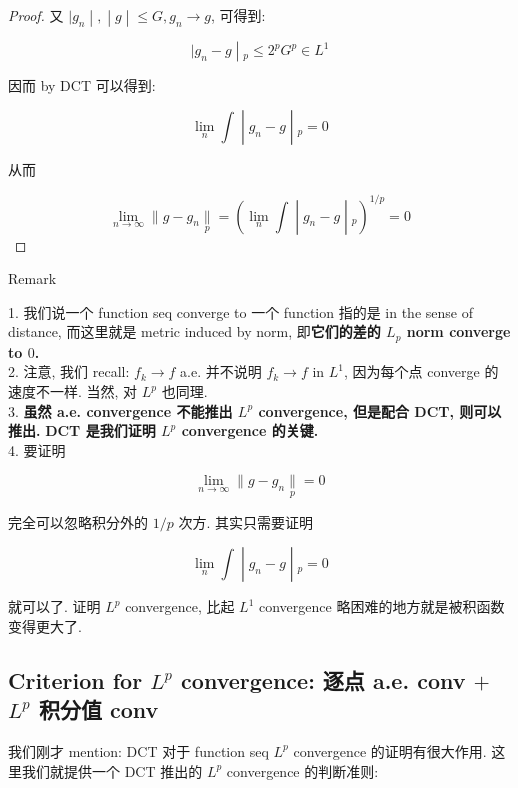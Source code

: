 \documentclass{qlnotes-export}
\begin{document}
\begin{proof}
又 \(\left. |g_{n} \middle| , \middle| g \middle| \leq G,g_{n}\rightarrow g \right.\), 可得到:

\[\left. |g_{n} - g \middle| {}_{p} \leq 2^{p}G^{p} \in L^{1} \right.\]

因而 by DCT 可以得到:

\[\left. \lim\limits_{n}\int \middle| g_{n} - g \middle| {}_{p} = 0 \right.\]

从而

\[\left. \lim\limits_{n\rightarrow\infty} \parallel g - g_{n}\underset{p}{\parallel} = (\lim\limits_{n}\int \middle| g_{n} - g \middle| {}_{p})^{1/p} = 0 \right.\]

\end{proof}

\begin{qlremark}{Remark}

1. 我们说一个 function seq converge to 一个 function 指的是 in the sense of distance, 而这里就是 metric induced by norm, 即\textbf{它们的差的 \(L_{p}\) norm converge to \(0\).}\\
2. 注意, 我们 recall: \(f_{k}\rightarrow f\) a.e. 并不说明 \(f_{k}\rightarrow f\) in \(L^{1}\), 因为每个点 converge 的速度不一样. 当然, 对 \(L^{p}\) 也同理.\\
3. \textbf{虽然 a.e. convergence 不能推出 \(L^{p}\) convergence, 但是配合 DCT, 则可以推出.} \textbf{DCT 是我们证明 \(L^{p}\) convergence 的关键.}\\
4. 要证明

\[\lim\limits_{n\rightarrow\infty} \parallel g - g_{n}\underset{p}{\parallel} = 0\]

完全可以忽略积分外的 \(1/p\) 次方. 其实只需要证明

\[\left. \lim\limits_{n}\int \middle| g_{n} - g \middle| {}_{p} = 0 \right.\]

就可以了. 证明 \(L^{p}\) convergence, 比起 \(L^{1}\) convergence 略困难的地方就是被积函数变得更大了.

\end{qlremark}

\subsection{\texorpdfstring{Criterion for \(L^{p}\) convergence: 逐点 a.e. conv \(+\) \(L^{p}\) 积分值 conv}{Criterion for L\^{}\{p\} convergence: 逐点 a.e. conv + L\^{}\{p\} 积分值 conv}}\label{criterion-for-lp-convergence-ux9010ux70b9-a.e.-conv-lp-ux79efux5206ux503c-conv}

我们刚才 mention: DCT 对于 function seq \(L^{p}\) convergence 的证明有很大作用. 这里我们就提供一个 DCT 推出的 \(L^{p}\) convergence 的判断准则:
\end{document}
